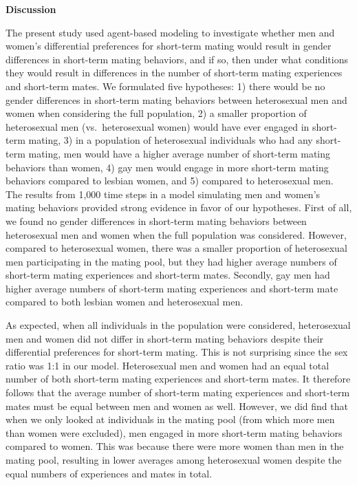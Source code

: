 \documentclass[
  12pt,
]{article}
\begin{document}
\textbf{Discussion}

The present study used agent-based modeling to investigate whether men
and women's differential preferences for short-term mating would result
in gender differences in short-term mating behaviors, and if so, then
under what conditions they would result in differences in the number of
short-term mating experiences and short-term mates. We formulated five
hypotheses: 1) there would be no gender differences in short-term mating
behaviors between heterosexual men and women when considering the full
population, 2) a smaller proportion of heterosexual men
(vs.~heterosexual women) would have ever engaged in short-term mating,
3) in a population of heterosexual individuals who had any short-term
mating, men would have a higher average number of short-term mating
behaviors than women, 4) gay men would engage in more short-term mating
behaviors compared to lesbian women, and 5) compared to heterosexual
men. The results from 1,000 time steps in a model simulating men and
women's mating behaviors provided strong evidence in favor of our
hypotheses. First of all, we found no gender differences in short-term
mating behaviors between heterosexual men and women when the full
population was considered. However, compared to heterosexual women,
there was a smaller proportion of heterosexual men participating in the
mating pool, but they had higher average numbers of short-term mating
experiences and short-term mates. Secondly, gay men had higher average
numbers of short-term mating experiences and short-term mate compared to
both lesbian women and heterosexual men.

As expected, when all individuals in the population were considered,
heterosexual men and women did not differ in short-term mating behaviors
despite their differential preferences for short-term mating. This is
not surprising since the sex ratio was 1:1 in our model. Heterosexual
men and women had an equal total number of both short-term mating
experiences and short-term mates. It therefore follows that the average
number of short-term mating experiences and short-term mates must be
equal between men and women as well. However, we did find that when we
only looked at individuals in the mating pool (from which more men than
women were excluded), men engaged in more short-term mating behaviors
compared to women. This was because there were more women than men in
the mating pool, resulting in lower averages among heterosexual women
despite the equal numbers of experiences and mates in total.
\end{document}
